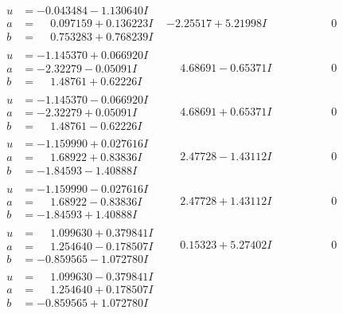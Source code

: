 \documentclass[1p]{elsarticle_modified}
\theoremstyle{definition}
\begin{document}
$$\begin{array}{c|c|c}
\begin{aligned}
u &= -0.043484 - 1.130640 I \\
a &= \phantom{-}0.097159 + 0.136223 I \\
b &= \phantom{-}0.753283 + 0.768239 I\end{aligned}
 & -2.25517 + 5.21998 I & \phantom{-0.000000 } 0 \\ \hline\begin{aligned}
u &= -1.145370 + 0.066920 I \\
a &= -2.32279 - 0.05091 I \\
b &= \phantom{-}1.48761 + 0.62226 I\end{aligned}
 & \phantom{-}4.68691 - 0.65371 I & \phantom{-0.000000 } 0 \\ \hline\begin{aligned}
u &= -1.145370 - 0.066920 I \\
a &= -2.32279 + 0.05091 I \\
b &= \phantom{-}1.48761 - 0.62226 I\end{aligned}
 & \phantom{-}4.68691 + 0.65371 I & \phantom{-0.000000 } 0 \\ \hline\begin{aligned}
u &= -1.159990 + 0.027616 I \\
a &= \phantom{-}1.68922 + 0.83836 I \\
b &= -1.84593 - 1.40888 I\end{aligned}
 & \phantom{-}2.47728 - 1.43112 I & \phantom{-0.000000 } 0 \\ \hline\begin{aligned}
u &= -1.159990 - 0.027616 I \\
a &= \phantom{-}1.68922 - 0.83836 I \\
b &= -1.84593 + 1.40888 I\end{aligned}
 & \phantom{-}2.47728 + 1.43112 I & \phantom{-0.000000 } 0 \\ \hline\begin{aligned}
u &= \phantom{-}1.099630 + 0.379841 I \\
a &= \phantom{-}1.254640 - 0.178507 I \\
b &= -0.859565 - 1.072780 I\end{aligned}
 & \phantom{-}0.15323 + 5.27402 I & \phantom{-0.000000 } 0 \\ \hline\begin{aligned}
u &= \phantom{-}1.099630 - 0.379841 I \\
a &= \phantom{-}1.254640 + 0.178507 I \\
b &= -0.859565 + 1.072780 I\end{aligned}

\end{array}$$
\end{document}
